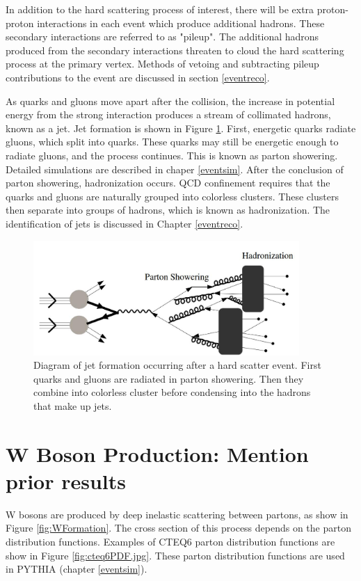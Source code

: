 \documentclass[oneside, letterpaper, oldfontcommands]{memoir}
\begin{document}
\qquad In addition to the hard scattering process of interest, there will be extra proton-proton interactions in each event which produce additional hadrons. These secondary interactions are referred to as "pileup". The additional hadrons produced from the secondary interactions threaten to cloud the hard scattering process at the primary vertex. Methods of vetoing and subtracting pileup contributions to the event are discussed in section \ref{eventreco}. 

\qquad As quarks and gluons move apart after the collision, the increase in potential energy from the strong interaction produces a stream of collimated hadrons, known as a jet. Jet formation is shown in Figure \ref{fig:JetFormation}. First, energetic quarks radiate gluons, which split into quarks. These quarks may still be energetic enough to radiate gluons, and the process continues. This is known as parton showering. Detailed simulations are described in chaper \ref{eventsim}. After the conclusion of parton showering, hadronization occurs. QCD confinement requires that the quarks and gluons are naturally grouped into colorless clusters. These clusters then separate into groups of hadrons, which is known as hadronization. The identification of jets is discussed in Chapter \ref{eventreco}.

\begin{figure}[here]
\includegraphics[width=0.9\textwidth]{jetformation.jpg}
\caption{Diagram of jet formation occurring after a hard scatter event. First quarks and gluons are radiated in parton showering. Then they combine into colorless cluster before condensing into the hadrons that make up jets.}
\label{fig:JetFormation}
\end{figure}



\section{W Boson Production: Mention prior results}\label{wboson}
\qquad W bosons are produced by deep inelastic scattering between partons, as show in Figure \ref{fig:WFormation}. The cross section of this process depends on the parton distribution functions. Examples of CTEQ6 parton distribution functions are show in Figure \ref{fig:cteq6PDF.jpg}\cite{Pumplin:2002vw}. These parton distribution functions are used in PYTHIA (chapter \ref{eventsim}).
\end{document}
